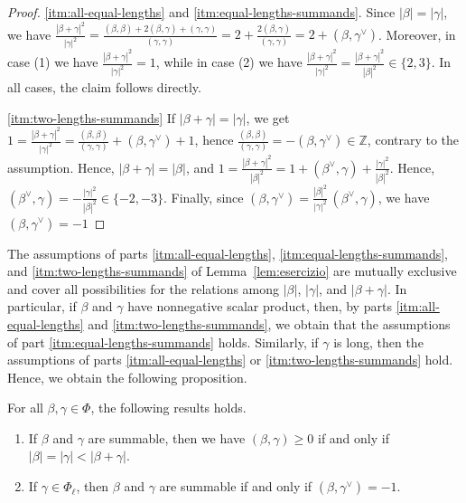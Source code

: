 \documentclass[ALCO,published]{cedram}
\theoremstyle{plain}
\newcommand\ganz{\mathbb Z}
\newcommand\be{\beta}
\newcommand\ga{\gamma}
\begin{document}
\begin{proof}
\ref{itm:all-equal-lengths} and \ref{itm:equal-lengths-summands}. 
Since $|\be|=|\ga|$, we have $\frac{|\be+\ga|^2}{ |\ga|^2}= \frac{(\be,\be)+2(\be,\ga)+(\ga,\ga)}{(\ga,\ga)}=2+\frac{2(\be,\ga)}{(\ga,\ga)}=2+(\be,\ga^\vee)$. 
Moreover, in case (1) we have $\frac{|\be+\ga|^2}{ |\ga|^2}=1$, while in case (2) we have $\frac{|\be+\ga|^2}{ |\ga|^2}=\frac{|\be+\ga|^2}{ |\be|^2}\in \{2, 3\}$. 
In all cases, the claim follows directly. 

\par
\ref{itm:two-lengths-summands} If $|\be+\ga|=|\ga|$, we get $1=\frac{|\be+\ga|^2}{ |\ga|^2}= \frac{(\be,\be)}{(\ga, \ga)}+(\be,\ga^\vee)+1$, hence $\frac{(\be,\be)}{(\ga, \ga)}=-(\be,\ga^\vee)\in \ganz$, contrary to the assumption.
Hence, $|\be+\ga|=|\be|$, and $1=\frac{|\be+\ga|^2}{ |\be|^2}= 1+(\be^\vee,\ga)+\frac{|\ga|^2}{ |\be|^2}$.
Hence, $(\be^\vee,\ga)=-\frac{|\ga|^2}{ |\be|^2}\in \{-2, -3\}$.
Finally, since $(\be,\ga^\vee)=\frac{ |\be|^2}{|\ga|^2}\,(\be^\vee,\ga)$, we have $(\be,\ga^\vee)=-1$
\end{proof}
\medskip

\par
The assumptions of parts \ref{itm:all-equal-lengths}, \ref{itm:equal-lengths-summands}, and \ref{itm:two-lengths-summands} of Lemma~\ref{lem:esercizio} are mutually exclusive and cover all possibilities for the relations among $|\be|$, $|\ga|$, and  $|\be+\ga|$.  
In particular, if $\be$ and $\ga$ have nonnegative scalar product, then, by parts \ref{itm:all-equal-lengths} and \ref{itm:two-lengths-summands}, we obtain that the assumptions of part \ref{itm:equal-lengths-summands} holds. 
Similarly, if $\ga$ is long, then the assumptions of parts \ref{itm:all-equal-lengths} or \ref{itm:two-lengths-summands} hold.
Hence, we obtain the following proposition. 

\begin{pro}\label{pro:summable-acute}
For all $\be, \ga\in \Phi$, the following results holds.
\begin{enumerate}
\item 
If $\be$ and $\ga$ are summable, then  we have 
$(\be, \ga)\geq 0$ if and only if $|\be|= | \ga|<|\be+\ga|$.
\label{itm:general}
\item
If $\ga\in \Phi_\ell$, then $\be$ and $\ga$ are summable if and only if $(\be, \ga^\vee)=-1$.
\label{itm:long}
\end{enumerate}
\end{pro}
\end{document}
